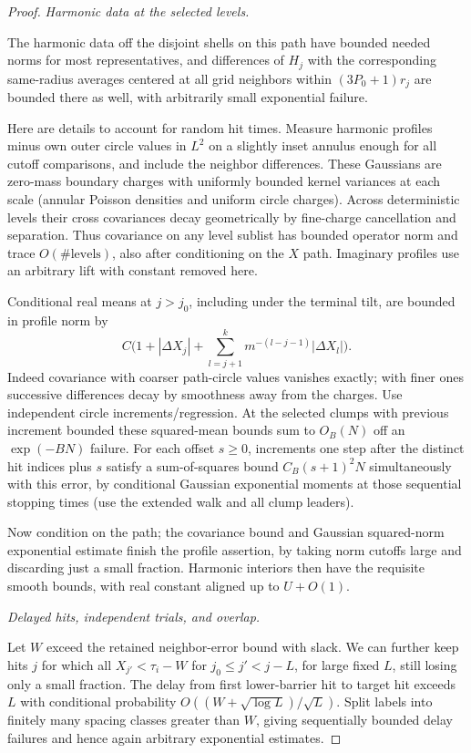 \begin{proof}
\smallskip\noindent\emph{Harmonic data at the selected levels.}\par

The harmonic data off the disjoint shells on this path have bounded needed norms for most
representatives, and differences of \(H_j\) with the corresponding same-radius averages centered at
all grid neighbors within \((3P_0+1)r_j\) are bounded there as well, with arbitrarily small
exponential failure.

Here are details to account for random hit times. Measure harmonic profiles minus own outer circle
values in \(L^2\) on a slightly inset annulus enough for all cutoff comparisons, and include the
neighbor differences. These Gaussians are zero-mass boundary charges with uniformly bounded kernel
variances at each scale (annular Poisson densities and uniform circle charges). Across deterministic
levels their cross covariances decay geometrically by fine-charge cancellation and separation. Thus
covariance on any level sublist has bounded operator norm and trace \(O(\#\mathrm{levels})\), also
after conditioning on the \(X\) path. Imaginary profiles use an arbitrary lift with constant removed
here.

Conditional real means at \(j>j_0\), including under the terminal tilt, are bounded in profile norm by
\[
 C\Big (1+|\Delta X_j|+\sum _{l=j+1}^k m^{-(l-j-1)}|\Delta X_l|\Big ).
\]
Indeed covariance with coarser path-circle values vanishes exactly; with finer ones successive
differences decay by smoothness away from the charges. Use independent circle increments/regression.
At the selected clumps with previous increment bounded these squared-mean bounds sum to \(O_B(N)\)
off an \(\exp (-B N)\) failure. For each offset \(s\ge 0\), increments one step after the distinct
hit indices plus \(s\) satisfy a sum-of-squares bound \(C_B(s+1)^2N\) simultaneously with this
error, by conditional Gaussian exponential moments at those sequential stopping times (use the
extended walk and all clump leaders).

Now condition on the path; the covariance bound and Gaussian squared-norm exponential estimate
finish the profile assertion, by taking norm cutoffs large and discarding just a small fraction.
Harmonic interiors then have the requisite smooth bounds, with real constant aligned up to
\(U+O(1)\).

\smallskip\noindent\emph{Delayed hits, independent trials, and overlap.}\par

Let \(W\) exceed the retained neighbor-error bound with slack. We can further keep hits \(j\) for
which all \(X_{j'}<\tau _i-W\) for \(j_0\le j'<j-L\), for large fixed \(L\), still losing only a
small fraction. The delay from first lower-barrier hit to target hit exceeds \(L\) with conditional
probability \(O((W+\sqrt {\log L})/\sqrt L)\). Split labels into finitely many spacing classes
greater than \(W\), giving sequentially bounded delay failures and hence again arbitrary exponential
estimates.


\end{proof}
